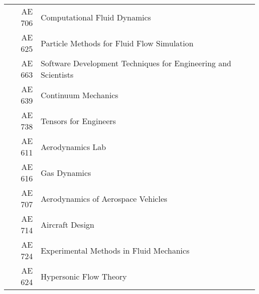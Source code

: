 %
%





\begin{tabular}{rl}
  AE 706 &  Computational Fluid Dynamics\\
  AE 625 &  Particle Methods for Fluid Flow Simulation\\
  AE 663 &  Software Development Techniques for Engineering and Scientists\\
  AE 639 &  Continuum Mechanics\\
  AE 738 &  Tensors for Engineers\\
  AE 611 &  Aerodynamics Lab\\
  AE 616 &  Gas Dynamics\\
  AE 707 &  Aerodynamics of Aerospace Vehicles\\
  AE 714 &  Aircraft Design\\
  AE 724 &  Experimental Methods in Fluid Mechanics\\
  AE 624 &  Hypersonic Flow Theory\\
\end{tabular}
